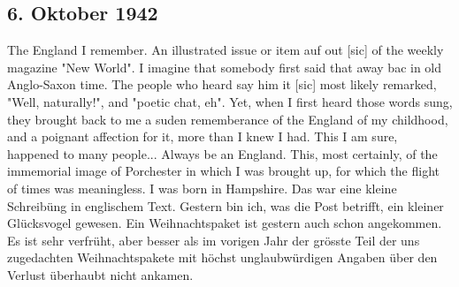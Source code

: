 \subsection{6. Oktober 1942}

The England I remember.
An illustrated issue or item auf out{\color{red} [sic] } of the weekly magazine "New World".
I imagine that somebody first said that away bac in old Anglo-Saxon time.
The people who heard say him it{\color{red} [sic] } most likely remarked, "Well, naturally!", and "poetic chat, eh".
Yet, when I first heard those words sung, they brought back to me a suden rememberance of the England of my childhood, and a poignant affection for it, more than I knew I had.
This I am sure, happened to many people...
Always be an England.
This, most certainly, of the immemorial image of Porchester in which I was brought up, for which the flight of times was meaningless.
I was born in Hampshire.
Das war eine kleine Schreib\"{u}ng in englischem Text.
Gestern bin ich, was die Post betrifft, ein kleiner Gl\"{u}cksvogel gewesen.
Ein Weihnachtspaket ist gestern auch schon angekommen.
Es ist sehr verfr\"{u}ht, aber besser als im vorigen Jahr der gr\"{o}sste Teil der uns zugedachten Weihnachtspakete mit h\"{o}chst unglaubw\"{u}rdigen Angaben \"{u}ber den Verlust \"{u}berhaubt nicht ankamen.

\clearpage
